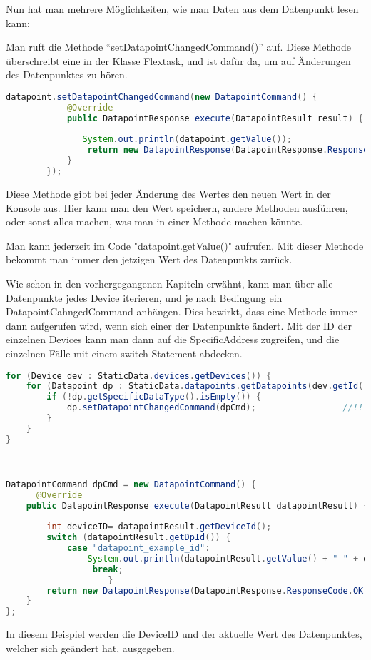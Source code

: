 Nun hat man mehrere Möglichkeiten, wie man Daten aus dem Datenpunkt lesen kann: 
\begin{compactenum}
    \item Man ruft die Methode “setDatapointChangedCommand()” auf. Diese Methode überschreibt eine in der Klasse Flextask, und ist dafür da, um auf Änderungen des Datenpunktes zu hören.
    \begin{lstlisting}[language=java,caption=Example catapoint usage,label=lst:impl:foo]
        datapoint.setDatapointChangedCommand(new DatapointCommand() { 
            @Override 
            public DatapointResponse execute(DatapointResult result) { 
         
               System.out.println(datapoint.getValue()); 
                return new DatapointResponse(DatapointResponse.ResponseCode.OK); 
            } 
        }); 
    \end{lstlisting}
    Diese Methode gibt bei jeder Änderung des Wertes den neuen Wert in der Konsole aus. Hier kann man den Wert speichern, andere Methoden ausführen, oder sonst alles machen, was man in einer Methode machen könnte. 

    \item Man kann jederzeit im Code "datapoint.getValue()" aufrufen. Mit dieser Methode bekommt man immer den jetzigen Wert des Datenpunkts zurück.   
    \item Wie schon in den vorhergegangenen Kapiteln erwähnt, kann man über alle Datenpunkte jedes Device iterieren, und je nach Bedingung ein DatapointCahngedCommand anhängen. Dies bewirkt, dass eine Methode immer dann aufgerufen wird, wenn sich einer der Datenpunkte ändert. Mit der ID der einzelnen Devices kann man dann auf die SpecificAddress zugreifen, und die einzelnen Fälle mit einem switch Statement abdecken. 
    \begin{lstlisting}[language=java,caption=Example multible datapoint usage,label=lst:impl:foo]
        for (Device dev : StaticData.devices.getDevices()) { 
    for (Datapoint dp : StaticData.datapoints.getDatapoints(dev.getId())) { 
        if (!dp.getSpecificDataType().isEmpty()) { 
            dp.setDatapointChangedCommand(dpCmd);                 //!!! 
        } 
    } 
} 

 

DatapointCommand dpCmd = new DatapointCommand() { 
      @Override 
    public DatapointResponse execute(DatapointResult datapointResult) { 
 
        int deviceID= datapointResult.getDeviceId();  
        switch (datapointResult.getDpId()) { 
            case "datapoint_example_id": 
                System.out.println(datapointResult.getValue() + " " + deviceID ); 
                 break; 
                    } 
        return new DatapointResponse(DatapointResponse.ResponseCode.OK); 
    } 
}; 

    \end{lstlisting}
    In diesem Beispiel werden die DeviceID und der aktuelle Wert des Datenpunktes, welcher sich geändert hat, ausgegeben.
\end{compactenum}

